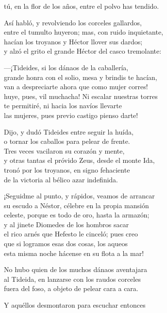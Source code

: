 tú, en la flor de los años, entre el polvo has tendido.\par
Así habló, y revolviendo los corceles gallardos,\\
entre el tumulto huyeron; mas, con ruido inquietante,\\
hacían los troyanos y Héctor llover sus dardos;\\
y alzó el grito el grande Héctor del casco tremolante:\par
---¡Tideides, si los dánaos de la caballería,\\
grande honra con el solio, mesa y brindis te hacían,\\
van a despreciarte ahora que como mujer corres!\\
huye, pues, vil muchacha! Ni escalar nuestras torres\\
te permitiré, ni hacia los navíos llevarte\\
las mujeres, pues previo castigo pienso darte!\par
Dijo, y dudó Tideides entre seguir la huída,\\
o tornar los caballos para pelear de frente.\\
Tres veces vacilaron su corazón y mente,\\
y otras tantas el próvido Zeus, desde el monte Ida,\\
tronó por los troyanos, en signo fehaciente\\
de la victoria al bélico azar indefinida.\par
\poend
\separator
%
\postart
{}
¡Seguidme al punto, y rápidos, veamos de arrancar\\
su escudo a Néstor, célebre en la propia mansión\\
celeste, porque es todo de oro, hasta la armazón;\\
y al jinete Diomedes de los hombros sacar\\
el rico arnés que Hefesto le cinceló; pues creo\\
que si logramos esas dos cosas, los aqueos\\
esta misma noche hácense en su flota a la mar!\par
\poend
\separator
%
\postart
{}
No hubo quien de los muchos dánaos aventajara\\
al Tideida, en lanzarse con los raudos corceles\\
fuera del foso, a objeto de pelear cara a cara.\par
\poend
\separator
%
\postart
{}
Y aquéllos desmontaron para escuchar entonces\\
